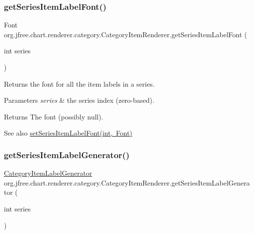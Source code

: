 \subsubsection{\texorpdfstring{get\+Series\+Item\+Label\+Font()}{getSeriesItemLabelFont()}}
{\footnotesize\ttfamily Font org.\+jfree.\+chart.\+renderer.\+category.\+Category\+Item\+Renderer.\+get\+Series\+Item\+Label\+Font (\begin{DoxyParamCaption}\item[{int}]{series }\end{DoxyParamCaption})}

Returns the font for all the item labels in a series.


\begin{DoxyParams}{Parameters}
{\em series} & the series index (zero-\/based).\\
\hline
\end{DoxyParams}
\begin{DoxyReturn}{Returns}
The font (possibly {\ttfamily null}).
\end{DoxyReturn}
\begin{DoxySeeAlso}{See also}
\mbox{\hyperlink{interfaceorg_1_1jfree_1_1chart_1_1renderer_1_1category_1_1_category_item_renderer_a6db6cbca30485a625bac7dec9e6e00a0}{set\+Series\+Item\+Label\+Font(int, Font)}} 
\end{DoxySeeAlso}
\mbox{\label{interfaceorg_1_1jfree_1_1chart_1_1renderer_1_1category_1_1_category_item_renderer_a39fd0df143abb1baf56ba931552a3047}} 
\subsubsection{\texorpdfstring{get\+Series\+Item\+Label\+Generator()}{getSeriesItemLabelGenerator()}}
{\footnotesize\ttfamily \mbox{\hyperlink{interfaceorg_1_1jfree_1_1chart_1_1labels_1_1_category_item_label_generator}{Category\+Item\+Label\+Generator}} org.\+jfree.\+chart.\+renderer.\+category.\+Category\+Item\+Renderer.\+get\+Series\+Item\+Label\+Generator (\begin{DoxyParamCaption}\item[{int}]{series }\end{DoxyParamCaption})}

